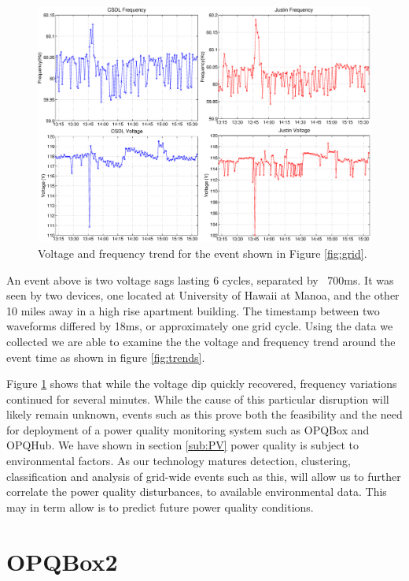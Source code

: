 \begin{figure}[h!]
\centering
\includegraphics[width=1\textwidth]{img/gridwide_trends.eps}
\caption{Voltage and frequency trend for the event shown in Figure \ref{fig:grid}.}
\label{fig:daytrends}
\end{figure} 
An event above is two voltage sags lasting 6 cycles, separated by ~700ms. It was seen by two devices, one located at University of Hawaii at Manoa, and the other 10 miles away in a high rise apartment building. The timestamp between two waveforms differed by 18ms, or approximately one grid cycle. Using the data we collected we are able to examine the the voltage and frequency trend around the event time as shown in figure \ref{fig:trends}.

Figure \ref{fig:daytrends} shows that while the voltage dip quickly recovered, frequency variations continued for several minutes. While the cause of this particular disruption will likely remain unknown, events such as this prove both the feasibility and the need for deployment of a power quality monitoring system such as OPQBox and OPQHub. We have shown in section \ref{sub:PV} power quality is subject to environmental factors. As our technology matures detection, clustering, classification and analysis of grid-wide events such as this, will allow us to further correlate the power quality disturbances, to available environmental data. This may in term allow is to predict future power quality conditions.


\section{OPQBox2}\label{chap:further}

